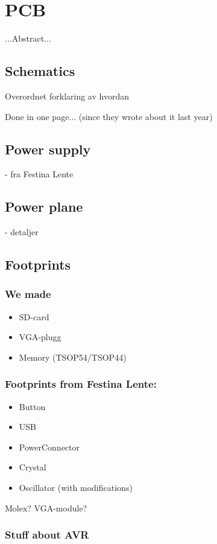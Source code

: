 \chapter {PCB}

...Abstract...

\section {Schematics}

Overordnet forklaring av hvordan

Done in one page... (since they wrote about it last year)

\section {Power supply} 
- fra Festina Lente

\section {Power plane}
- detaljer

\section {Footprints}

\subsection {We made}
\begin{itemize}
\item SD-card
\item VGA-plugg
\item Memory (TSOP54/TSOP44)
\end{itemize}

\subsection {Footprints from Festina Lente:}
\begin{itemize}
\item Button
\item USB
\item PowerConnector
\item Crystal
\item Oscillator (with modifications)
\end{itemize}
Molex?
VGA-module?

\subsection {Stuff about AVR}
